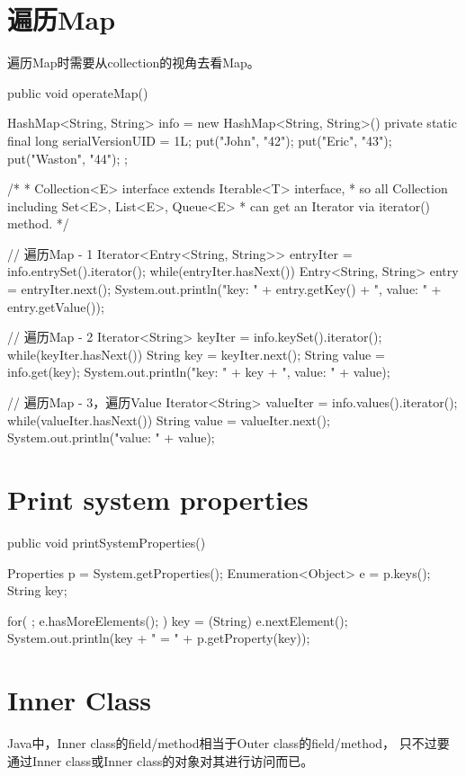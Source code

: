 \documentclass[a4paper,11pt]{article}
\begin{document}
\section[遍历Map]{遍历Map}
遍历Map时需要从collection的视角去看Map。

\begin{javacode}
public void operateMap() {
  HashMap<String, String> info = new HashMap<String, String>() {
    private static final long serialVersionUID = 1L;
    {
      put("John", "42");
      put("Eric", "43");
      put("Waston", "44");
    }
  };

  /*
   * Collection<E> interface extends Iterable<T> interface,
   * so all Collection including Set<E>, List<E>, Queue<E>
   * can get an Iterator via iterator() method.
   */

  // 遍历Map - 1
  Iterator<Entry<String, String>> entryIter = info.entrySet().iterator();
  while(entryIter.hasNext()) {
    Entry<String, String> entry = entryIter.next();
    System.out.println("key: " + entry.getKey() + ", value: " + entry.getValue());
  }

  // 遍历Map - 2
  Iterator<String> keyIter = info.keySet().iterator();
  while(keyIter.hasNext()) {
    String key = keyIter.next();
    String value = info.get(key);
    System.out.println("key: " + key + ", value: " + value);
  }

  // 遍历Map - 3，遍历Value
  Iterator<String> valueIter = info.values().iterator();
  while(valueIter.hasNext()) {
    String value = valueIter.next();
    System.out.println("value: " + value);
  }
}
\end{javacode}

\section[Print system properties]{Print system properties}
\begin{javacode}
public void printSystemProperties() {
  Properties p = System.getProperties();
  Enumeration<Object> e = p.keys();
  String key;

  for( ; e.hasMoreElements(); ) {
    key = (String) e.nextElement();
    System.out.println(key + " = " + p.getProperty(key));
  }
}
\end{javacode}

\section[Inner Class]{Inner Class}
Java中，Inner class的field/method相当于Outer class的field/method，
只不过要通过Inner class或Inner class的对象对其进行访问而已。
\end{document}
